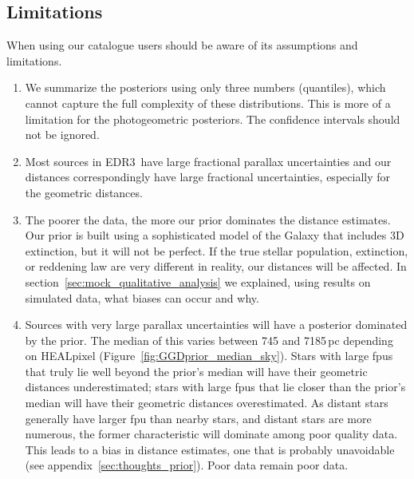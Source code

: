 \documentclass[twocolumn]{aastex62}
\providecommand{\release}{EDR3}
\providecommand{\parallax}{\ensuremath{\varpi}}
\providecommand{\sigparallax}{\ensuremath{\sigma_{\varpi}}}
\providecommand{\fpu}{\ensuremath{\sigparallax/\parallax}}
\begin{document}
\subsection{Limitations}

When using our catalogue users should be aware of its assumptions and limitations.
\begin{enumerate}

\item We summarize the posteriors using only three numbers (quantiles), which cannot capture the full complexity of these distributions. This is more of a limitation for the photogeometric posteriors. The confidence intervals should not be ignored.

\item Most sources in \release\ have large fractional parallax uncertainties and our distances correspondingly have large fractional uncertainties, especially for the geometric distances.

\item The poorer the data, the more our prior dominates the distance estimates. Our prior is built using a sophisticated model of the Galaxy that includes 3D extinction, but it will not be perfect. If the true stellar population, extinction, or reddening law are very different in reality, our distances will be affected. In section~\ref{sec:mock_qualitative_analysis} we explained, using results on simulated data, what biases can occur and why. 

\item Sources with very large parallax uncertainties will have a posterior dominated by the prior.
The median of this varies between 745 and 7185\,pc depending on HEALpixel (Figure~\ref{fig:GGDprior_median_sky}). Stars with large fpus that truly lie well beyond the prior's median will have their geometric distances underestimated; stars with large fpus that lie closer than the prior's median will have their geometric distances overestimated. As distant stars generally have larger fpu than nearby stars, and distant stars are more numerous, the former characteristic will dominate among poor quality data. This leads to a bias in distance estimates, one that is probably unavoidable (see appendix~\ref{sec:thoughts_prior}). Poor data remain poor data.


\end{enumerate}
\end{document}
